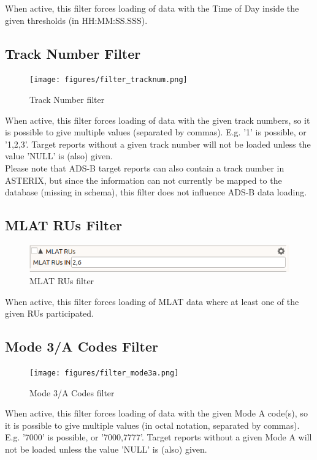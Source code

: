 When active, this filter forces loading of data with the Time of Day inside the given thresholds (in HH:MM:SS.SSS).

\subsection{Track Number Filter}

\begin{figure}[H]
  \center
    \texttt{[image: figures/filter\_tracknum.png]}
  \caption{Track Number filter}
\end{figure}

When active, this filter forces loading of data with the given track numbers, so it is possible to give multiple values (separated by commas). E.g. '1' is possible, or '1,2,3'. Target reports without a given track number will not be loaded unless the value 'NULL' is (also) given. \\

Please note that ADS-B target reports can also contain a track number in ASTERIX, but since the information can not currently be mapped to the database (missing in schema), this filter does not influence ADS-B data loading.

\subsection{MLAT RUs Filter}

\begin{figure}[H]
  \center
    \includegraphics[width=12cm,frame]{figures/filter_mlatrus.png}
  \caption{MLAT RUs filter}
\end{figure}

When active, this filter forces loading of MLAT data where at least one of the given RUs participated.

\subsection{Mode 3/A Codes Filter}

\begin{figure}[H]
  \center
    \texttt{[image: figures/filter\_mode3a.png]}
  \caption{Mode 3/A Codes filter}
\end{figure}

When active, this filter forces loading of data with the given Mode A code(s), so it is possible to give multiple values (in octal notation, separated by commas). E.g. '7000' is possible, or '7000,7777'. Target reports without a given Mode A will not be loaded unless the value 'NULL' is (also) given. \\


